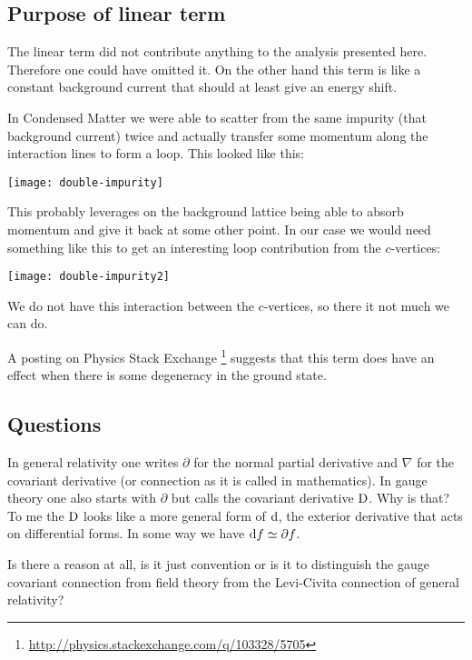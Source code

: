 \documentclass[11pt, english, fleqn, DIV=15, headinclude]{scrartcl}
\begin{document}
\subsection{Purpose of linear term}

The linear term did not contribute anything to the analysis presented here.
Therefore one could have omitted it. On the other hand this term is like a
constant background current that should at least give an energy shift.

In Condensed Matter we were able to scatter from the same impurity (that
background current) twice and actually transfer some momentum along the
interaction lines to form a loop. This looked like this:

\hspace{\mathindent}\texttt{[image: double-impurity]}

This probably leverages on the background lattice being able to absorb momentum
and give it back at some other point. In our case we would need something like
this to get an interesting loop contribution from the $c$-vertices:

\hspace{\mathindent}\texttt{[image: double-impurity2]}

We do not have this interaction between the $c$-vertices, so there it not much
we can do.

A posting on Physics Stack Exchange
\footnote{\url{http://physics.stackexchange.com/q/103328/5705}} suggests that
this term does have an effect when there is some degeneracy in the ground
state.



\needspace{10ex}
\begin{appendix}
    \section{Questions} 

\begin{question}
    In general relativity one writes $\partial$ for the normal partial
    derivative and $\nabla$ for the covariant derivative (or connection as it
    is called in mathematics). In gauge theory one also starts with $\partial$
    but calls the covariant derivative $\mathop{}\!\mathrm D$. Why is that? To me the $\mathop{}\!\mathrm D$
    looks like a more general form of $\mathop{}\!\mathrm d$, the exterior derivative that acts
    on differential forms. In some way we have $\dif f \simeq \vec\partial f$.

    Is there a reason at all, is it just convention or is it to distinguish the
    gauge covariant connection from field theory from the Levi-Civita
    connection of general relativity?
\end{question}

\end{appendix}
\end{document}
